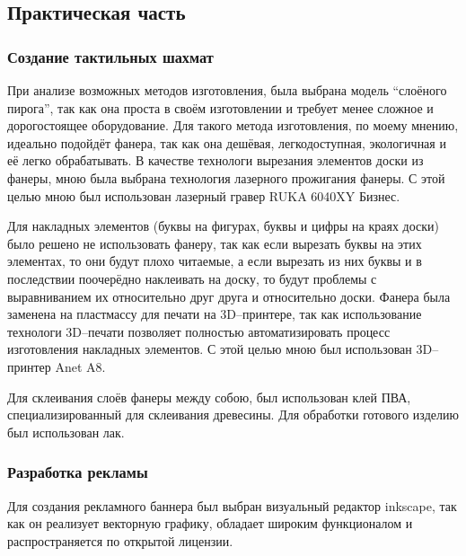 \subsection{Практическая часть}
\subsubsection{Создание тактильных шахмат}
При анализе возможных методов изготовления, была выбрана модель ``слоёного
пирога'', так как она проста в своём изготовлении и требует менее сложное и
дорогостоящее оборудование. Для такого метода изготовления, по моему мнению,
идеально подойдёт фанера, так как она дешёвая, легкодоступная, экологичная и её
легко обрабатывать. В качестве технологи вырезания элементов доски из фанеры,
мною была выбрана технология лазерного прожигания фанеры. С этой целью мною был
использован лазерный гравер RUKA 6040XY Бизнес.

Для накладных элементов (буквы на фигурах, буквы и цифры на краях доски) было
решено не использовать фанеру, так как если вырезать буквы на этих элементах,
то они будут плохо читаемые, а если вырезать из них буквы и в последствии
поочерёдно наклеивать на доску, то будут проблемы с выравниванием их
относительно друг друга и относительно доски. Фанера была заменена на
пластмассу для печати на 3D--принтере, так как использование технологи
3D--печати позволяет полностью автоматизировать процесс изготовления накладных
элементов. С этой целью мною был использован 3D--принтер Anet A8.

Для склеивания слоёв фанеры между собою, был использован клей ПВА,
специализированный для склеивания древесины. Для обработки готового изделию был
использован лак. 

\subsubsection{Разработка рекламы}
Для создания рекламного баннера был выбран визуальный редактор \gls{inkscape},
так как он реализует векторную графику, обладает широким функционалом и распространяется по открытой
лицензии.

